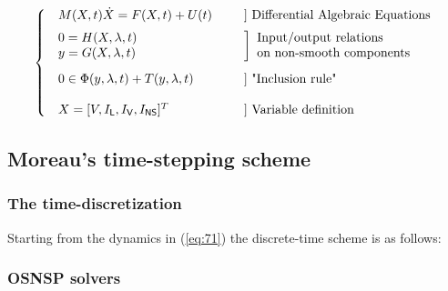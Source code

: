 \documentclass{article}
\begin{document}
\begin{equation}
  \label{eq:71}
 \left\{ \begin{array}{l l l}
    \begin{array}{l}
  M(X,t) \dot X = F(X,t) + U(t)
\end{array}
& & ]\text{ Differential Algebraic Equations}\\[2mm]
  \begin{array}{l}
    0 = H(X,\lambda,t)\\
    y = G(X,\lambda,t) 
  \end{array} &  & \bigg]\begin{array}{l}
   \text{Input/output relations }\\
   \text{on non-smooth components}
  \end{array}  \\[5mm]
  \begin{array}{l}
  0 \in \Phi(y,\lambda,t) + T(y,\lambda,t)
\end{array}
&  & ] \text{ "Inclusion rule"}\\ \\
 \begin{array}{l}X =[V,I_{\mathsf L}, I_{\mathsf V}, I_{\mathsf{NS}}]^T
 \end{array}
 & &] \text{ Variable definition}\\
\end{array}\right.
\end{equation}







\subsection{Moreau's time-stepping scheme}
\label{section23}



\subsubsection{The time-discretization}

Starting from the dynamics in (\ref{eq:71}) the discrete-time scheme is as follows:


\subsubsection{OSNSP solvers}
\end{document}
